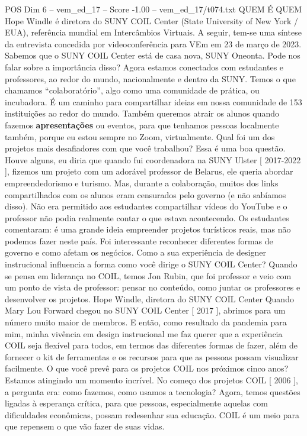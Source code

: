 \begin{textsample}{POS Dim 6 – vem\_ed\_17 – Score -1.00 – vem\_ed\_17/t074.txt}  \label{ex:f6_pos_043}
QUEM É QUEM Hope Windle é diretora do SUNY COIL Center (State University of New York / EUA), referência mundial em Intercâmbios Virtuais.
A seguir, tem-se uma síntese da entrevista concedida por videoconferência para VEm em 23 de março de 2023.
Sabemos que o SUNY COIL Center está de casa nova, SUNY Oneonta.
Pode nos falar sobre a importância disso?
Agora estamos conectados com estudantes e professores, ao redor do mundo, nacionalmente e dentro da SUNY.
Temos o que chamamos “colaboratório”, algo como uma comunidade de prática, ou incubadora.
É um caminho para compartilhar ideias em nossa comunidade de 153 instituições ao redor do mundo.
Também queremos atrair os alunos quando fazemos \textbf{apresentações} ou eventos, para que tenhamos pessoas localmente também, porque eu estou sempre no Zoom, virtualmente.
Qual foi um dos projetos mais desafiadores com que você trabalhou?
Essa é uma boa questão.
Houve alguns, eu diria que quando fui coordenadora na SUNY Ulster [ 2017-2022 ], fizemos um projeto com um adorável professor de Belarus, ele queria abordar empreendedorismo e turismo.
Mas, durante a colaboração, muitos dos links compartilhados com os alunos eram censurados pelo governo (e não sabíamos disso).
Não era permitido aos estudantes compartilhar vídeos do YouTube e o professor não podia realmente contar o que estava acontecendo.
Os estudantes comentaram: é uma grande ideia empreender projetos turísticos reais, mas não podemos fazer neste país.
Foi interessante reconhecer diferentes formas de governo e como afetam os negócios.
Como a sua experiência de designer instrucional influencia a forma como você dirige o SUNY COIL Center?
Quando se pensa em liderança no COIL, temos Jon Rubin, que foi professor e veio com um ponto de vista de professor: pensar no conteúdo, como juntar os professores e desenvolver os projetos.
Hope Windle, diretora do SUNY COIL Center Quando Mary Lou Forward chegou no SUNY COIL Center [ 2017 ], abrimos para um número muito maior de membros.
E então, como resultado da pandemia para mim, minha vivência em design instrucional me faz querer que a experiência COIL seja flexível para todos, em termos das diferentes formas de fazer, além de fornecer o kit de ferramentas e os recursos para que as pessoas possam visualizar facilmente.
O que você prevê para os projetos COIL nos próximos cinco anos?
Estamos atingindo um momento incrível.
No começo dos projetos COIL [ 2006 ], a pergunta era: como fazemos, como usamos a tecnologia?
Agora, temos questões ligadas à esperança crítica, para que pessoas, especialmente aquelas com dificuldades econômicas, possam redesenhar sua educação.
COIL é um meio para que repensem o que vão fazer de suas vidas.

\end{textsample}

